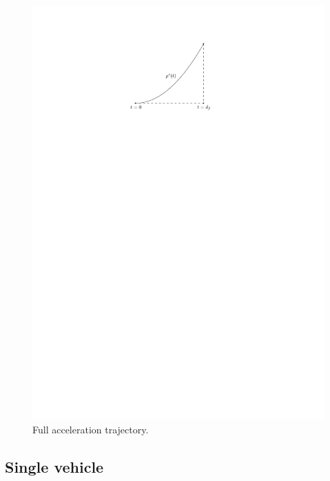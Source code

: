 \documentclass[a4paper]{article}
\theoremstyle{definition}
\theoremstyle{plain}
\begin{document}
\begin{figure}
  \centering
  \includegraphics[scale=1]{figures/motion/acceleration}
  \caption{Full acceleration trajectory.}
  \label{fig:acceleration}
\end{figure}

\subsection{Single vehicle}
\label{sec:single}
\end{document}
